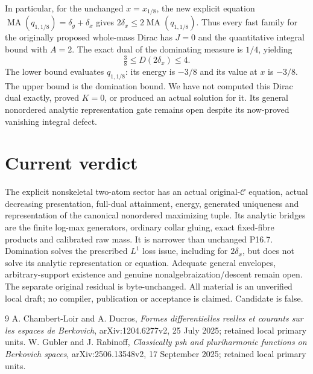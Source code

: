 \documentclass[11pt]{article}
\newcommand{\MA}{\operatorname{MA}}
\newcommand{\C}{\mathcal C}
\begin{document}
In particular, for the unchanged $x=x_{1/8}$, the new explicit equation
$\MA(q_{1,1/8})=\delta_g+\delta_x$ gives
$2\delta_x\le2\MA(q_{1,1/8})$.
Thus every fast family for the originally proposed whole-mass Dirac
has $J=0$ and the quantitative integral bound with $A=2$.
The exact dual of the dominating measure is $1/4$, yielding
\[
 \tfrac38\le D(2\delta_x)\le4.
\]
The lower bound evaluates $q_{1,1/8}$: its energy is $-3/8$ and
its value at $x$ is $-3/8$. The upper bound is the domination bound.
We have not computed this Dirac dual exactly, proved $K=0$, or produced
an actual solution for it. Its general nonordered analytic representation
gate remains open despite its now-proved vanishing integral defect.

\section{Current verdict}
The explicit nonskeletal two-atom sector has an actual original-$\C$
equation, actual decreasing presentation, full-dual attainment, energy,
generated uniqueness and representation of the canonical nonordered
maximizing tuple. Its analytic bridges are the finite log-max generators,
ordinary collar gluing, exact fixed-fibre products and calibrated raw mass.
It is narrower than unchanged P16.7. Domination solves the prescribed
$L^1$ loss issue, including for $2\delta_x$, but does not solve its
analytic representation or equation. Adequate general envelopes,
arbitrary-support existence and genuine nonalgebraization/descent remain
open. The separate original residual is byte-unchanged. All material is
an unverified local draft; no compiler, publication or acceptance is claimed.
Candidate is false.

\begin{thebibliography}{9}
 A. Chambert-Loir and A. Ducros, \emph{Formes differentielles
reelles et courants sur les espaces de Berkovich}, arXiv:1204.6277v2,
25 July 2025; retained local primary units.
 W. Gubler and J. Rabinoff, \emph{Classically psh and
pluriharmonic functions on Berkovich spaces}, arXiv:2506.13548v2,
17 September 2025; retained local primary units.
\end{thebibliography}
\end{document}
